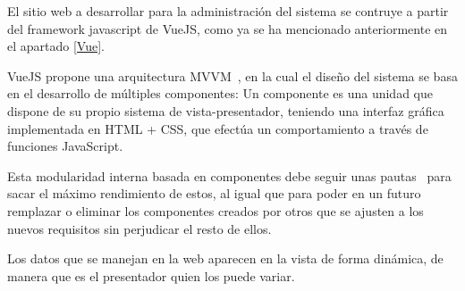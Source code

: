 El sitio web a desarrollar para la administración del sistema se contruye a partir del framework javascript de VueJS, como ya se ha mencionado anteriormente en el apartado \ref{Vue}.

VueJS propone una arquitectura MVVM~\cite{mvvm}, en la cual el diseño del sistema se basa en el desarrollo de múltiples componentes: Un componente es una unidad que dispone de su propio sistema de vista-presentador, teniendo una interfaz gráfica implementada en HTML + CSS, que efectúa un comportamiento a través de funciones JavaScript.

Esta modularidad interna basada en componentes debe seguir unas pautas~\cite{vuecomp} para sacar el máximo rendimiento de estos, al igual que para poder en un futuro remplazar o eliminar los componentes creados por otros que se ajusten a los nuevos requisitos sin perjudicar el resto de ellos.

Los datos que se manejan en la web aparecen en la vista de forma dinámica, de manera que es el presentador quien los puede variar.
